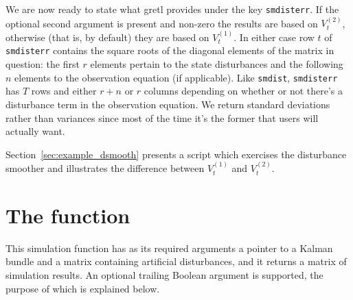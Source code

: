 \documentclass[a4paper]{article}
\begin{document}
We are now ready to state what gretl provides under the key
\texttt{smdisterr}. If the optional second argument is present and
non-zero the results are based on $V^{(2)}_t$, otherwise (that is, by
default) they are based on $V^{(1)}_t$. In either case row $t$ of
\texttt{smdisterr} contains the square roots of the diagonal elements
of the matrix in question: the first $r$ elements pertain to the state
disturbances and the following $n$ elements to the observation
equation (if applicable). Like \texttt{smdist}, \texttt{smdisterr} has
$T$ rows and either $r+n$ or $r$ columns depending on whether or not
there's a disturbance term in the observation equation. We return
standard deviations rather than variances since most of the time
it's the former that users will actually want.

Section~\ref{sec:example_dsmooth} presents a script which exercises
the disturbance smoother and illustrates the difference between
$V^{(1)}_t$ and $V^{(2)}_t$.


\section{The  function}
\label{sec:ksimul}

This simulation function has as its required arguments a pointer to a
Kalman bundle and a matrix containing artificial disturbances, and it
returns a matrix of simulation results. An optional trailing Boolean
argument is supported, the purpose of which is explained below.
\end{document}
